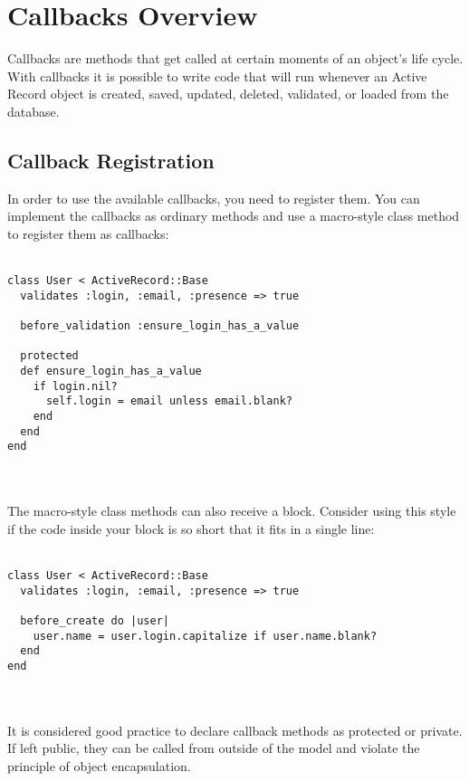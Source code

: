 \documentclass[10pt]{book}
\begin{document}
\section{ Callbacks Overview}

Callbacks are methods that get called at certain moments of an  object’s life cycle. With callbacks it is possible to write code that  will run whenever an Active Record object is created, saved, updated,  deleted, validated, or loaded from the database.

\subsection{ Callback Registration}

In order to use the available callbacks, you need to register them.  You can implement the callbacks as ordinary methods and use a  macro-style class method to register them as callbacks:
\\ \\
\begin{minipage}{\textwidth}{\scriptsize
\begin{verbatim}
class User < ActiveRecord::Base
  validates :login, :email, :presence => true
 
  before_validation :ensure_login_has_a_value
 
  protected
  def ensure_login_has_a_value
    if login.nil?
      self.login = email unless email.blank?
    end
  end
end
\end{verbatim}}
\end{minipage}
\\ \\

The macro-style class methods can also receive a block. Consider  using this style if the code inside your block is so short that it fits  in a single line:
\\ \\
\begin{minipage}{\textwidth}{\scriptsize
\begin{verbatim}
class User < ActiveRecord::Base
  validates :login, :email, :presence => true
 
  before_create do |user|
    user.name = user.login.capitalize if user.name.blank?
  end
end
\end{verbatim}}
\end{minipage}
\\ \\

It is considered good practice to declare callback methods as  protected or private. If left public, they can be called from outside of  the model and violate the principle of object encapsulation.
\end{document}
